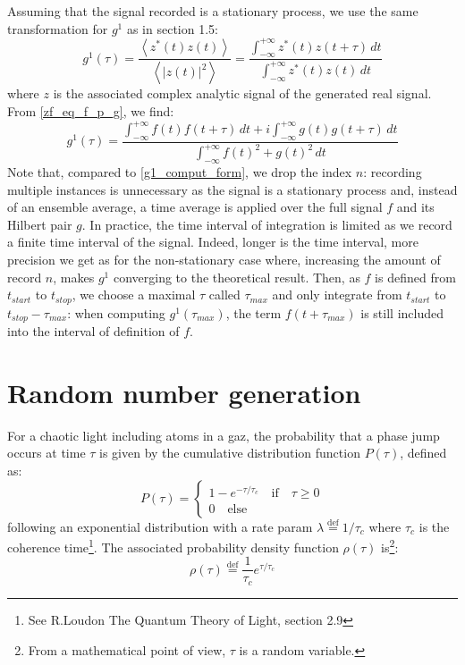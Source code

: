 \documentclass[10pt]{report}
\begin{document}
Assuming that the signal recorded is a stationary process, we use the same transformation for $g^1$ as in section 1.5:
\begin{equation}
g^1(\tau) = \frac{\left\langle z^*(t)z(t) \right\rangle}{\left\langle \vert z(t) \vert ^2 \right\rangle} = \frac{\int_{-\infty}^{+\infty} z^*(t)z(t + \tau)\, dt}{\int_{-\infty}^{+\infty} z^*(t)z(t) \, dt}
\end{equation}
where $z$ is the associated complex analytic signal of the generated real signal. From \eqref{zf_eq_f_p_g}, we find:
\begin{equation}
\label{g1_stattionary_computer}
g^1(\tau) = \frac{\int_{-\infty}^{+\infty} f(t)f(t + \tau)\, dt  + i \int_{-\infty}^{+\infty} g(t)g(t + \tau)\, dt}{\int_{-\infty}^{+\infty} f(t)^2 + g(t)^2 \, dt}
\end{equation}
Note that, compared to \eqref{g1_comput_form}, we drop the index $n$: recording multiple instances is unnecessary as the signal is a stationary process and, instead of an ensemble average, a time average is applied over the full signal $f$ and its Hilbert pair $g$. In practice, the time interval of integration is limited as we record a finite time interval of the signal. Indeed, longer is the time interval, more precision we get as for the non-stationary case where, increasing the amount of record $n$, makes $g^1$ converging to the theoretical result. Then, as $f$ is defined from $t_{start}$ to $t_{stop}$, we choose a maximal $\tau$ called $\tau_{max}$ and only integrate from $t_{start}$ to $t_{stop} - \tau_{max}$: when computing $g^1(\tau_{max})$, the term $f(t+\tau_{max})$ is still included into the interval of definition of $f$.

\section{Random number generation}

For a chaotic light including atoms in a gaz, the probability that a phase jump occurs at time $\tau$ is given by the cumulative distribution function $P(\tau)$, defined as:
\begin{equation}
P(\tau) = \left\{
                \begin{array}{ll}
                1-e^{-\tau/\tau_c} \quad \textrm{if} \quad \tau \geqslant 0\\
                0 \quad \textrm{else}
                \end{array}
              \right.
\end{equation}
following an exponential distribution with a rate param $\lambda \stackrel{\text{def}}{=} 1 / \tau_c$ where $\tau_c$ is the coherence time\footnote{ See R.Loudon The Quantum Theory of Light, section 2.9}. The associated probability density function $\rho(\tau)$ is\footnote{From a mathematical point of view, $\tau$ is a random variable.}:
\begin{equation}
\rho(\tau) \stackrel{\text{def}}{=} \frac{1}{\tau_c} e^{\tau / \tau_c}
\end{equation}
\end{document}
